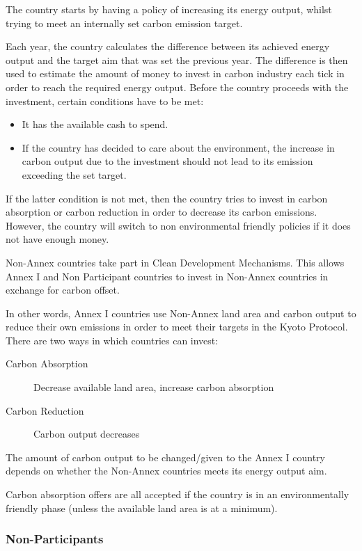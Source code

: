 The country starts by having a policy of increasing its energy output, whilst trying to meet an internally set carbon emission target.

Each year, the country calculates the difference between its achieved energy output and the target aim that was set the previous year. The difference is then used to estimate the amount of money to invest in carbon industry each tick in order to reach the required energy output. Before the country proceeds with the investment, certain conditions have to be met:

\begin{itemize}
	\item It has the available cash to spend.
	\item If the country has decided to care about the environment, the increase in carbon output due to the investment should not lead to its emission exceeding the set target.
\end{itemize}

If the latter condition is not met, then the country tries to invest in carbon absorption or carbon reduction in order to decrease its carbon emissions. However, the country will switch to non environmental friendly policies if it does not have enough money.
 
Non-Annex countries take part in Clean Development Mechanisms. This allows Annex I and Non Participant countries to invest in Non-Annex countries in exchange for carbon offset.

In other words, Annex I countries use Non-Annex land area and carbon output to reduce their own emissions in order to meet their targets in the Kyoto Protocol. There are two ways in which countries can invest:
 
\begin{description}
	\item[Carbon Absorption] Decrease available land area, increase carbon absorption
	\item[Carbon Reduction] Carbon output decreases
\end{description}
 
The amount of carbon output to be changed/given to the Annex I country depends on whether the Non-Annex countries meets its energy output aim.

Carbon absorption offers are all accepted if the country is in an environmentally friendly phase (unless the available land area is at a minimum). 

\subsubsection{Non-Participants}

